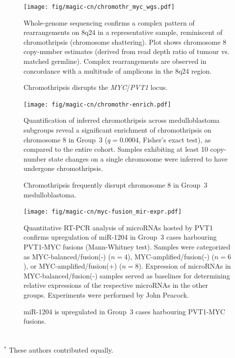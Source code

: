 \documentclass[11pt,letterpaper]{article}
\theoremstyle{definition}
\begin{document}
\begin{figure}[h]
	\begin{center}
		\texttt{[image: fig/magic-cn/chromothr\_myc\_wgs.pdf]}
	\end{center}
	\caption{Chromothripsis disrupts the \emph{MYC}/\emph{PVT1} locus.}
	Whole-genome sequencing confirms a complex pattern of rearrangements on 8q24 in a representative sample, reminiscent of chromothripsis (chromosome shattering).
	Plot shows chromosome 8 copy-number estimates (derived from read depth ratio of tumour vs. matched germline).
	Complex rearrangements are observed in concordance with a multitude of amplicons in the 8q24 region.
	\label{fig:chromothr_myc_wgs}
\end{figure}

\begin{figure}[h]
	\begin{center}
		\texttt{[image: fig/magic-cn/chromothr-enrich.pdf]}
	\end{center}
	\caption{Chromothripsis frequently disrupt chromosome 8 in Group~3 medulloblastoma.}
	Quantification of inferred chromothripsis across medulloblastoma subgroups reveal a significant enrichment of chromothripsis on chromosome 8 in Group~3 ($q = 0.0004$, Fisher's exact test), as compared to the entire cohort. Samples exhibiting at least 10 copy-number state changes on a single chromosome were inferred to have undergone chromothripsis.
	\label{fig:chromothr-enrich}
\end{figure}

\begin{figure}[h]
	\begin{center}
		\texttt{[image: fig/magic-cn/myc-fusion\_mir-expr.pdf]}
	\end{center}
	\caption{miR-1204 is upregulated in Group~3 cases harbouring PVT1-MYC fusions.}
	Quantitative RT-PCR analysis of microRNAs hosted by PVT1 confirms upregulation of miR-1204 in Group~3 cases harbouring PVT1-MYC fusions (Mann-Whitney test). Samples were categorized as MYC-balanced/fusion(-) ($n = 4$), MYC-amplified/fusion(-) ($n = 6$), or MYC-amplified/fusion(+) ($n = 8$). Expression of microRNAs in MYC-balanced/fusion(-) samples served as baselines for determining relative expressions of the respective microRNAs in the other groups. Experiments were performed by John Peacock.
	\label{fig:myc-fusion_mir-expr}
\end{figure}

\clearpage

\section{}

\begin{multicols}{2}
\small
{}
\end{multicols}

\clearpage

\bigskip
$^*$ These authors contributed equally.
\end{document}
